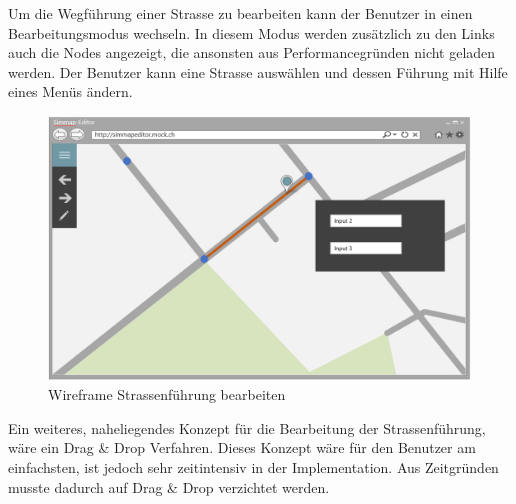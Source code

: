 \newpage
\noindent
Um die Wegführung einer Strasse zu bearbeiten kann der Benutzer in einen Bearbeitungsmodus wechseln. In diesem Modus werden zusätzlich zu den Links auch die Nodes angezeigt, die ansonsten aus Performancegründen nicht geladen werden. Der Benutzer kann eine Strasse auswählen und dessen Führung mit Hilfe eines Menüs ändern.
\begin{figure}[H]
\centering
\includegraphics[height=7cm]{images/KonzeptChangeStreet.PNG}
\caption{Wireframe Strassenführung bearbeiten}
\label{fig:conceptchangeStreet}
\end{figure}
\noindent
Ein weiteres, naheliegendes Konzept für die Bearbeitung der Strassenführung, wäre ein Drag \& Drop Verfahren. Dieses Konzept wäre für den Benutzer am einfachsten, ist jedoch sehr zeitintensiv in der Implementation. Aus Zeitgründen musste dadurch auf Drag \& Drop verzichtet werden.
